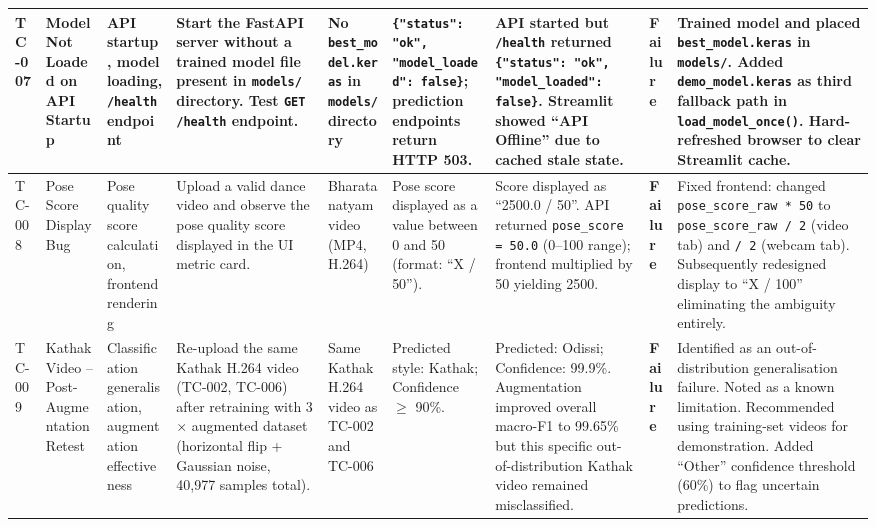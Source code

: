 \documentclass[12pt,a4paper]{article}
\begin{document}
\begin{longtable}{|P{0.6cm}|P{2.2cm}|P{2.2cm}|P{2.8cm}|P{2.4cm}|P{3.0cm}|P{3.0cm}|P{1.1cm}|P{2.4cm}|}
TC-007 &
Model Not Loaded on API Startup &
API startup, model loading, \texttt{/health} endpoint &
Start the FastAPI server without a trained model file present in \texttt{models/} directory. Test \texttt{GET /health} endpoint. &
No \texttt{best\_model.keras} in \texttt{models/} directory &
\texttt{\{"status": "ok", "model\_loaded": false\}}; prediction endpoints return HTTP 503. &
API started but \texttt{/health} returned \texttt{\{"status": "ok", "model\_loaded": false\}}. Streamlit showed ``API Offline'' due to cached stale state. &
\textbf{Failure} &
Trained model and placed \texttt{best\_model.keras} in \texttt{models/}. Added \texttt{demo\_model.keras} as third fallback path in \texttt{load\_model\_once()}. Hard-refreshed browser to clear Streamlit cache. \\
\hline

TC-008 &
Pose Score Display Bug &
Pose quality score calculation, frontend rendering &
Upload a valid dance video and observe the pose quality score displayed in the UI metric card. &
Bharatanatyam video (MP4, H.264) &
Pose score displayed as a value between 0 and 50 (format: ``X / 50''). &
Score displayed as ``2500.0 / 50''. API returned \texttt{pose\_score = 50.0} (0--100 range); frontend multiplied by 50 yielding 2500. &
\textbf{Failure} &
Fixed frontend: changed \texttt{pose\_score\_raw * 50} to \texttt{pose\_score\_raw / 2} (video tab) and \texttt{/ 2} (webcam tab). Subsequently redesigned display to ``X / 100'' eliminating the ambiguity entirely. \\
\hline

TC-009 &
Kathak Video -- Post-Augmentation Retest &
Classification generalisation, augmentation effectiveness &
Re-upload the same Kathak H.264 video (TC-002, TC-006) after retraining with 3$\times$ augmented dataset (horizontal flip + Gaussian noise, 40,977 samples total). &
Same Kathak H.264 video as TC-002 and TC-006 &
Predicted style: Kathak; Confidence $\geq$ 90\%. &
Predicted: Odissi; Confidence: 99.9\%. Augmentation improved overall macro-F1 to 99.65\% but this specific out-of-distribution Kathak video remained misclassified. &
\textbf{Failure} &
Identified as an out-of-distribution generalisation failure. Noted as a known limitation. Recommended using training-set videos for demonstration. Added ``Other'' confidence threshold (60\%) to flag uncertain predictions. \\
\hline


\end{longtable}
\end{document}
